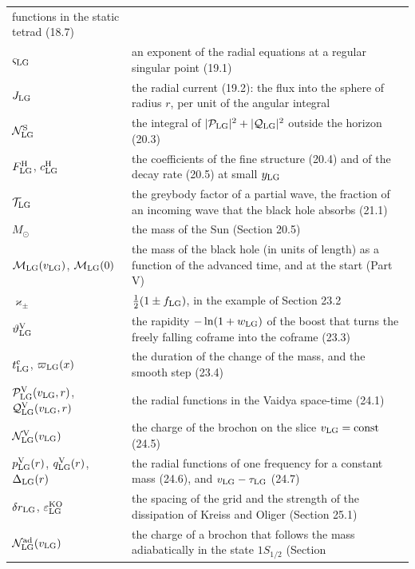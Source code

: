 \documentclass[
  10pt,
]{article}
\begin{document}
\begin{longtable}[]{@{}
  >{\raggedright\arraybackslash}p{}
  >{\raggedright\arraybackslash}p{}@{}}
functions in the static tetrad (18.7) \\
\(\varsigma_{\rm LG}\) & an exponent of the radial equations at a
regular singular point (19.1) \\
\(J_{\rm LG}\) & the radial current (19.2): the flux into the sphere of
radius \(r\), per unit of the angular integral \\
\(\mathcal N^{\rm S}_{\rm LG}\) & the integral of
\(\lvert\mathcal P_{\rm LG}\rvert^2+\lvert\mathcal Q_{\rm LG}\rvert^2\)
outside the horizon (20.3) \\
\(F^{\rm H}_{\rm LG}\), \(c^{\rm H}_{\rm LG}\) & the coefficients of the
fine structure (20.4) and of the decay rate (20.5) at small
\(y_{\rm LG}\) \\
\(\mathcal T_{\rm LG}\) & the greybody factor of a partial wave, the
fraction of an incoming wave that the black hole absorbs (21.1) \\
\(M_\odot\) & the mass of the Sun (Section 20.5) \\
\(\mathcal M_{\rm LG}(v_{\rm LG})\), \(\mathcal M_{\rm LG}(0)\) & the
mass of the black hole (in units of length) as a function of the
advanced time, and at the start (Part V) \\
\(\varkappa_\pm\) & \(\tfrac12(1\pm f_{\rm LG})\), in the example of
Section 23.2 \\
\(\vartheta^{\rm V}_{\rm LG}\) & the rapidity \(-\ln(1+w_{\rm LG})\) of
the boost that turns the freely falling coframe into the coframe
(23.3) \\
\(t^{\rm c}_{\rm LG}\), \(\varpi_{\rm LG}(x)\) & the duration of the
change of the mass, and the smooth step (23.4) \\
\(\mathcal P^{\rm V}_{\rm LG}(v_{\rm LG},r)\),
\(\mathcal Q^{\rm V}_{\rm LG}(v_{\rm LG},r)\) & the radial functions in
the Vaidya space-time (24.1) \\
\(\mathcal N^{\rm V}_{\rm LG}(v_{\rm LG})\) & the charge of the brochon
on the slice \(v_{\rm LG}=\text{const}\) (24.5) \\
\(p^{\rm V}_{\rm LG}(r)\), \(q^{\rm V}_{\rm LG}(r)\),
\(\Delta_{\rm LG}(r)\) & the radial functions of one frequency for a
constant mass (24.6), and \(v_{\rm LG}-\tau_{\rm LG}\) (24.7) \\
\(\delta r_{\rm LG}\), \(\varepsilon^{\rm KO}_{\rm LG}\) & the spacing
of the grid and the strength of the dissipation of Kreiss and Oliger
(Section 25.1) \\
\(\mathcal N^{\rm ad}_{\rm LG}(v_{\rm LG})\) & the charge of a brochon
that follows the mass adiabatically in the state \(1S_{1/2}\) (Section

\end{longtable}
\end{document}
